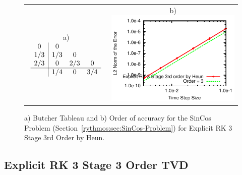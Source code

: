 \begin{figure}[H]
\centering{}%
\begin{tabular}{cc}
a) $\begin{array}{c|ccc}
0 & 0\\
1/3 & 1/3 & 0\\
2/3 & 0 & 2/3 & 0\\
\hline  & 1/4 & 0 & 3/4
\end{array}$ & b)\includegraphics[scale=1.5]{figures/ERK_3Stage3OrderHeun}\tabularnewline
\end{tabular}\caption{a) Butcher Tableau and b) Order of accuracy for the SinCos Problem
(Section~\ref{rythmos:sec:SinCos-Problem}) for Explicit RK 3 Stage
3rd Order by Heun.\label{rythmos:tab:ButcherTableau-ERK_3Stage3OrderHeun}}
\end{figure}



\subsection{Explicit RK 3 Stage 3 Order TVD}

